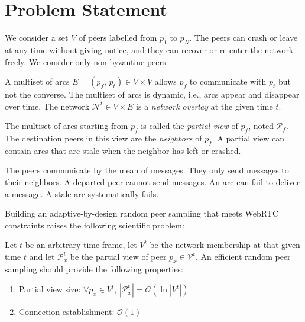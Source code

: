 
\section{Problem Statement}
\label{sec:problem-statement}

We consider a set $V$ of peers labelled from $p_1$ to $p_N$.  The peers can
crash or leave at any time without giving notice, and they can recover or
re-enter the network freely. We consider only non-byzantine peers.

A multiset of arcs $E = (p_f,\,p_t) \in V \times V$ allows $p_f$ to communicate
with $p_t$ but not the converse. The multiset of arcs is dynamic, i.e., arcs
appear and disappear over time. The network $\mathcal{N}^t \in V \times E$ is a
\emph{network overlay} at the given time $t$.

The multiset of arcs starting from $p_f$ is called the \emph{partial view} of
$p_f$, noted $\mathcal{P}_f$. The destination peers in this view are the
\emph{neighbors} of $p_f$. A partial view can contain arcs that are stale when
the neighbor has left or crashed.

The peers communicate by the mean of messages. They only send messages to their
neighbors. A departed peer cannot send messages. An arc can fail to deliver a
message. A stale arc systematically fails.

Building an adaptive-by-design random peer sampling that meets WebRTC
constraints raises the following scientific problem:
\begin{problem}
  Let $t$ be an arbitrary time frame, let $V^t$ be the network membership at
  that given time $t$ and let $\mathcal{P}_x^t$ be the partial view of peer
  $p_x \in \mathcal{V}^t$.  An efficient random peer sampling should provide
  the following properties:
  \begin{enumerate}
  \item Partial view size: \hfill
    $\forall p_x \in V^t,\, |\mathcal{P}_x^t| = \mathcal{O} (\ln
    |V^t|)$      
  \item Connection establishment: \hfill $\mathcal{O}(1)$
  \end{enumerate}
\end{problem}

